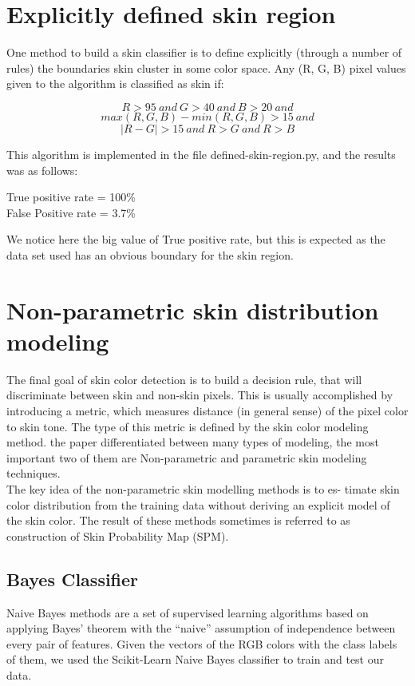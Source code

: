 \documentclass[12pt]{article} %
\begin{document}
\section{Explicitly defined skin region} 
One method to build a skin classifier is to define explicitly (through a number of rules) the boundaries skin cluster in some color space. Any (R, G, B) pixel values given to the algorithm is classified as skin if:

$$ R > 95 \: and   \: G > 40  \: and  \: B > 20  \: and $$ 
$$max(R, G, B) - min(R, G, B) > 15  \: and $$
$$|R − G| > 15  \: and  \: R > G  \: and  \: R > B $$

This algorithm is implemented in the file defined-skin-region.py, and the results was as follows:

\begin{center}
True positive rate = 100\% \\
False Positive rate = 3.7\%
\end{center}   

We notice here the big value of True positive rate, but this is expected as the data set used has an obvious boundary for the skin region. 


\section{Non-parametric skin distribution modeling} %
The final goal of skin color detection is to build a decision rule, that will discriminate between skin and non-skin pixels. This is usually accomplished by introducing a metric, which measures distance (in general sense) of the pixel color to skin tone. The type of this metric is defined by the skin color modeling method. the paper differentiated between many types of modeling, the most important two of them are Non-parametric and parametric skin modeling techniques.\\

The key idea of the non-parametric skin modelling methods is to es-
timate skin color distribution from the training data without deriving an explicit model of the skin color. The result of these methods sometimes is referred to as construction of Skin Probability Map (SPM).

\subsection{Bayes Classifier} 
Naive Bayes methods are a set of supervised learning algorithms based on applying Bayes’ theorem with the “naive” assumption of independence between every pair of features. Given the vectors of the RGB colors with the class labels of them, we used the Scikit-Learn Naive Bayes classifier to train and test our data. \\
\end{document}
